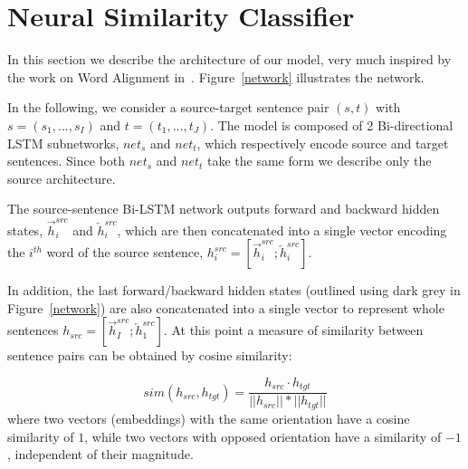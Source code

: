 \documentclass[11pt,a4paper]{article}
\begin{document}


\section{Neural Similarity Classifier}
\label{sec:similarity}

In this section we describe the architecture of our model, very much inspired by the work on Word Alignment in~\cite{W16-2207}. Figure~\ref{network} illustrates the network.
 
In the following, we consider a source-target sentence pair $(s,t)$ with $s=(s_1,...,s_I)$ and $t=(t_1,...,t_J)$. The model is composed of 2 Bi-directional LSTM subnetworks, $net_s$ and $net_t$, which respectively encode source and target sentences. Since both $net_s$ and $net_t$ take the same form we describe only the source architecture.

The source-sentence Bi-LSTM network outputs forward and backward hidden states, $\overrightarrow{h}^{src}_i$ and $\overleftarrow{h}^{src}_i$, which are then concatenated into a single vector encoding the $i^{th}$ word of the source sentence, 
$h^{src}_i = [ \overrightarrow{h}^{src}_i ; \overleftarrow{h}^{src}_i ]$.

In addition, the last forward/backward hidden states (outlined using dark grey in Figure~\ref{network}) are also concatenated into a single vector  to represent whole sentences 
$h_{src} = [ \overrightarrow{h}^{src}_I ; \overleftarrow{h}^{src}_1 ]$.
At this point a measure of similarity between sentence pairs can be obtained by cosine similarity: 

\begin{equation}
    sim(h_{src}, h_{tgt}) = \frac{h_{src} \cdotp h_{tgt}}{||h_{src}|| * ||h_{tgt}||}
    \label{cosine}
\end{equation}
\noindent where two vectors (embeddings) with the same orientation have a cosine similarity of $1$, while two vectors with opposed orientation have a similarity of $-1$, independent of their magnitude.
\end{document}
